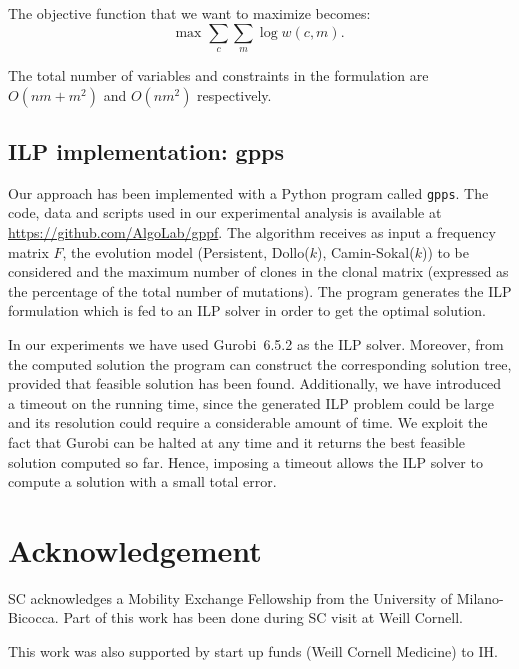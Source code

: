 \documentclass[a4paper,USenglish]{article}
\theoremstyle{definition}
\begin{document}
The objective function that we want to maximize becomes:
\begin{equation}
\label{eq:log-likelihood-goal}
    \mbox{max } \sum_c \sum_m \log w(c,m).
\end{equation}


The  total  number of  variables  and  constraints  in  the formulation  are
$O(nm+m^2)$ and $O(nm^2)$ respectively.

\subsection{ILP implementation: gpps}

Our approach has been implemented with a  Python program called \texttt{gpps}. 
  The code, data and scripts used in our experimental analysis is 
  available at \url{https://github.com/AlgoLab/gppf}.
The algorithm receives as input  a frequency matrix $F$, the evolution
  model  (Persistent, Dollo($k$),  Camin-Sokal($k$)) to  be considered
  and the maximum number of clones in the clonal matrix (expressed
  as the percentage of the total number of mutations).
The  program generates  the ILP  formulation which  is fed  to an  ILP
  solver in order to get the optimal solution.

In our experiments we have used Gurobi~6.5.2 as the ILP solver. 
Moreover, from  the computed  solution the  program can  construct the
  corresponding  solution tree,  provided that  feasible solution  has
  been found. 
Additionally, we have introduced a timeout on the running time, since the
  generated ILP problem could be large and its resolution could require
  a considerable amount of time.
%
We exploit the fact that Gurobi can be halted at any time and it returns the best
  feasible solution computed so far.
%
Hence, imposing a timeout allows the ILP solver to compute a solution with a small
  total error.

\section*{Acknowledgement}
SC acknowledges a Mobility Exchange Fellowship from the University of Milano-Bicocca. Part of this work has been done during SC visit at Weill Cornell.


This work was also supported by start up funds (Weill Cornell Medicine) to IH.

% 
%
%
%
% 
%


\end{document}
